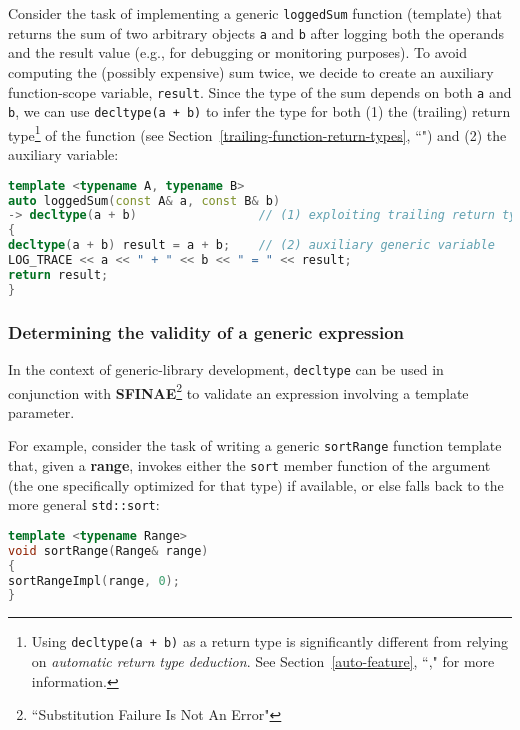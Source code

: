 Consider the task of implementing a generic \texttt{loggedSum} function
(template) that returns the sum of two arbitrary objects \texttt{a} and
\texttt{b} after logging both the operands and the result value (e.g.,
for debugging or monitoring purposes). To avoid computing the (possibly
expensive) sum twice, we decide to create an auxiliary function-scope
variable, \texttt{result}. Since the type of the sum depends on both
\texttt{a} and \texttt{b}, we can use
\texttt{decltype(a}~\texttt{+}~\texttt{b)} to infer the type for both
(1) the (trailing) return type{\cprotect\footnote{Using
\texttt{decltype(a}~\texttt{+}~\texttt{b)} as a return type is
significantly different from relying on \emph{automatic return type
deduction}. See Section~\ref{auto-feature}, ``," for more information.}} of the
function (see Section~\ref{trailing-function-return-types}, ``") and (2) the auxiliary variable:

\begin{lstlisting}[language=C++]
template <typename A, typename B>
auto loggedSum(const A& a, const B& b)
-> decltype(a + b)                 // (1) exploiting trailing return types
{
decltype(a + b) result = a + b;    // (2) auxiliary generic variable
LOG_TRACE << a << " + " << b << " = " << result;
return result;
}
\end{lstlisting}


\subsubsection[Determining the validity of a generic expression]{Determining the validity of a generic expression}\label{determining-the-validity-of-a-generic-expression}

In the context of generic-library development, \texttt{decltype} can be
used in conjunction with \textbf{SFINAE}\footnote{``Substitution Failure Is Not An Error"} to validate an expression involving a
template parameter.

For example, consider the task of writing a generic \texttt{sortRange}
function template that, given a \textbf{range}, invokes either the
\texttt{sort} member function of the argument (the one specifically
optimized for that type) if available, or else falls back to the more
general \texttt{std::sort}:

\begin{lstlisting}[language=C++]
template <typename Range>
void sortRange(Range& range)
{
sortRangeImpl(range, 0);
}
\end{lstlisting}

